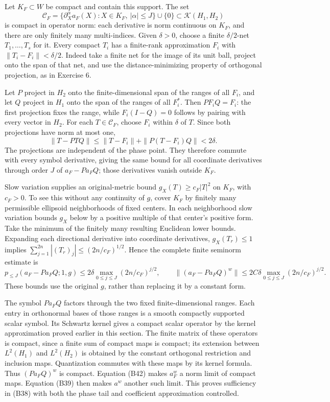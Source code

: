 \documentclass[
  11pt,
]{article}
\begin{document}
Let \(K_F\subset W\) be compact and contain this support. The set \[
 \mathcal C_F=\{\partial_X^\alpha a_F(X):X\in K_F,
                                 \ |\alpha|\le J\}\cup\{0\}
 \subset\mathcal K(H_1,H_2)
 \tag{B40}
\] is compact in operator norm: each derivative is norm continuous on
\(K_F\), and there are only finitely many multi-indices. Given
\(\delta>0\), choose a finite \(\delta/2\)-net \(T_1,\ldots,T_s\) for
it. Every compact \(T_i\) has a finite-rank approximation \(F_i\) with
\(\|T_i-F_i\|<\delta/2\). Indeed take a finite net for the image of its
unit ball, project onto the span of that net, and use the
distance-minimizing property of orthogonal projection, as in Exercise 6.

Let \(P\) project in \(H_2\) onto the finite-dimensional span of the
ranges of all \(F_i\), and let \(Q\) project in \(H_1\) onto the span of
the ranges of all \(F_i^*\). Then \(PF_iQ=F_i\): the first projection
fixes the range, while \(F_i(I-Q)=0\) follows by pairing with every
vector in \(H_2\). For each \(T\in\mathcal C_F\), choose \(F_i\) within
\(\delta\) of \(T\). Since both projections have norm at most one, \[
 \|T-PTQ\|\le\|T-F_i\|+\|P(T-F_i)Q\|<2\delta.
 \tag{B41}
\] The projections are independent of the phase point. They therefore
commute with every symbol derivative, giving the same bound for all
coordinate derivatives through order \(J\) of \(a_F-Pa_FQ\); those
derivatives vanish outside \(K_F\).

Slow variation supplies an original-metric bound \(g_X(T)\ge c_F|T|^2\)
on \(K_F\), with \(c_F>0\). To see this without any continuity of \(g\),
cover \(K_F\) by finitely many permissible ellipsoid neighborhoods of
fixed centers. In each neighborhood slow variation bounds \(g_X\) below
by a positive multiple of that center's positive form. Take the minimum
of the finitely many resulting Euclidean lower bounds. Expanding each
directional derivative into coordinate derivatives, \(g_X(T_r)\le1\)
implies \(\sum_{j=1}^{2n}|(T_r)_j|\le(2n/c_F)^{1/2}\). Hence the
complete finite seminorm estimate is \[
 p_{\le J}(a_F-Pa_FQ;1,g)
 \le 2\delta\max_{0\le j\le J}(2n/c_F)^{j/2},\qquad
 \|(a_F-Pa_FQ)^w\|
 \le 2C\delta\max_{0\le j\le J}(2n/c_F)^{j/2}.
 \tag{B42}
\] These bounds use the original \(g\), rather than replacing it by a
constant form.

The symbol \(Pa_FQ\) factors through the two fixed finite-dimensional
ranges. Each entry in orthonormal bases of those ranges is a smooth
compactly supported scalar symbol. Its Schwartz kernel gives a compact
scalar operator by the kernel approximation proved earlier in this
section. The finite matrix of these operators is compact, since a finite
sum of compact maps is compact; its extension between \(L^2(H_1)\) and
\(L^2(H_2)\) is obtained by the constant orthogonal restriction and
inclusion maps. Quantization commutes with these maps by its kernel
formula. Thus \((Pa_FQ)^w\) is compact. Equation (B42) makes \(a_F^w\) a
norm limit of compact maps. Equation (B39) then makes \(a^w\) another
such limit. This proves sufficiency in (B38) with both the phase tail
and coefficient approximation controlled.
\end{document}
